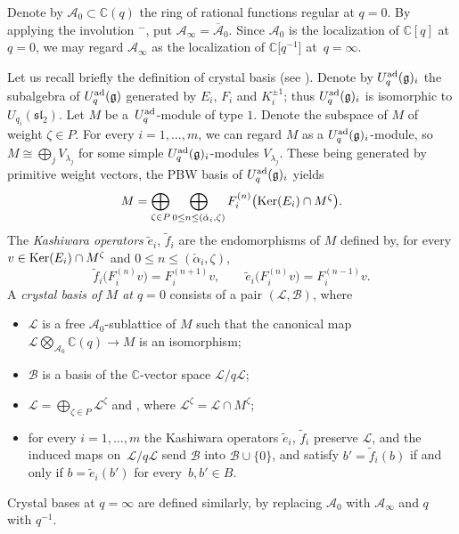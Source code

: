 \documentclass[pdftex]{sigma}
\numberwithin{equation}{section}
\theoremstyle{definition}
\newcommand{\mc}{\mathbb{C}}
\newcommand{\Ll}{{\mathcal L}}
\newcommand{\ra}{\rightarrow}
\begin{document}
Denote by $\mathcal{A}_0\subset \mc(q)$ the ring of rational functions regular at $q=0$. By applying the involution ${}^-$, put $\mathcal{A}_\infty=\overline{\mathcal{A}}_0$.
Since $\mathcal{A}_0$ is the localization of $\mc[q]$ at $q=0$, we may regard $\mathcal{A}_\infty$ as the localization of $\mc\big[q^{-1}\big]$ at~${q=\infty}$.

Let us recall briefly the definition of crystal basis (see \cite{Kashiwara1}). Denote by $U_q^{\rm ad}(\mathfrak{g})_i$ the subalgebra of $U_q^{\rm ad}(\mathfrak{g})$ generated by $E_i$, $F_i$ and $K_i^{\pm 1}$; thus $U_q^{\rm ad}(\mathfrak{g})_i$ is isomorphic to $U_{q_i}({\mathfrak{sl}_2})$. Let $M$ be a~$U_q^{\rm ad}$-module of type $1$. Denote  the subspace of $M$ of weight $\zeta\in P$. For every $i=1,\dots, m$, we can regard $M$ as a $U_q^{\rm ad}(\mathfrak{g})_i$-module, so $M\cong \bigoplus_j V_{\lambda_j}$ for some simple $U_q^{\rm ad}(\mathfrak{g})_i$-modules $V_{\lambda_j}$. These being generated by primitive weight vectors, the PBW basis of $U_q^{\rm ad}(\mathfrak{g})_i$ yields
\[M = \bigoplus_{\zeta\in P} \bigoplus_{0\leq n\leq (\check{\alpha}_i, \zeta)} F_i^{(n)}\big({\rm Ker}(E_i)\cap M^\zeta\big).\]
The {\it Kashiwara operators} $\tilde{e}_i$, $\tilde{f}_i$ are the endomorphisms of $M$ defined by, for every $v\in {\rm Ker}(E_i)\cap M^\zeta$ and $0\leq n\leq (\check{\alpha}_i, \zeta)$,
\[%
\tilde{f}_i\big(F_i^{(n)}v\big) = F_i^{(n+1)}v,\qquad \tilde{e}_i\big(F_i^{(n)}v\big) = F_i^{(n-1)}v.
\]
A {\it crystal basis of $M$ at $q=0$} consists of a pair $(\Ll, \mathcal{B})$, where
\begin{itemize}\itemsep=0pt
\item $\Ll$ is a free $\mathcal{A}_0$-sublattice of $M$ such that the canonical map $\Ll \bigotimes_{\mathcal{A}_0} \mc(q) \ra M$ is an isomorphism;
\item $\mathcal{B}$ is a basis of the $\mc$-vector space $\Ll/q\Ll$;
\item $ \Ll = \bigoplus_{\zeta \in P} \Ll^\zeta$ and \smash{$\mathcal{B} = \coprod_{\zeta \in P} \big(\mathcal{B}\cap \Ll^\zeta/q\Ll^\zeta\big)$}, where $\Ll^\zeta = \Ll\cap M^\zeta$;
\item for every $i=1,\dots, m$ the Kashiwara operators $\tilde{e}_i$, $\tilde{f}_i$ preserve $\Ll$, and the induced maps on~$\Ll/q\Ll$ send $\mathcal{B}$ into $\mathcal{B}\cup \{0\}$, and satisfy $b' = \tilde{f}_i(b)$ if and only if $b=\tilde{e}_i(b')$ for every~${b,b'\in B}$.
\end{itemize}
Crystal bases at $q=\infty$ are defined similarly, by replacing $\mathcal{A}_0$ with $\mathcal{A}_\infty$ and $q$ with $q^{-1}$.
\end{document}
